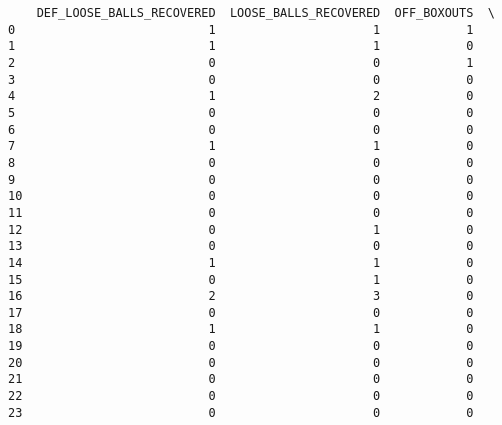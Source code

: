 \begin{verbatim}
    DEF_LOOSE_BALLS_RECOVERED  LOOSE_BALLS_RECOVERED  OFF_BOXOUTS  \
0                           1                      1            1   
1                           1                      1            0   
2                           0                      0            1   
3                           0                      0            0   
4                           1                      2            0   
5                           0                      0            0   
6                           0                      0            0   
7                           1                      1            0   
8                           0                      0            0   
9                           0                      0            0   
10                          0                      0            0   
11                          0                      0            0   
12                          0                      1            0   
13                          0                      0            0   
14                          1                      1            0   
15                          0                      1            0   
16                          2                      3            0   
17                          0                      0            0   
18                          1                      1            0   
19                          0                      0            0   
20                          0                      0            0   
21                          0                      0            0   
22                          0                      0            0   
23                          0                      0            0   


\end{verbatim}
